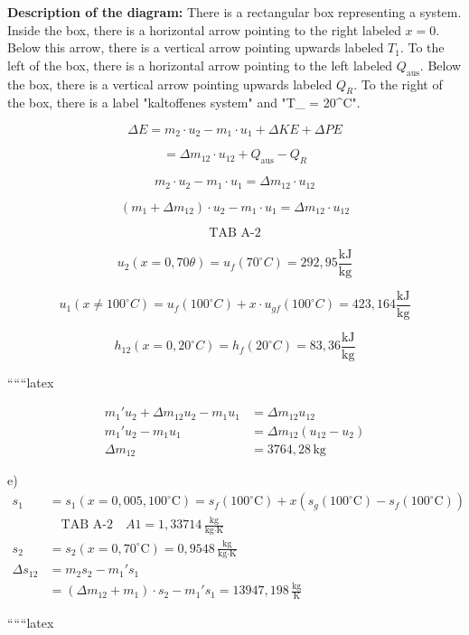 \textbf{Description of the diagram:} There is a rectangular box representing a system. Inside the box, there is a horizontal arrow pointing to the right labeled $x=0$. Below this arrow, there is a vertical arrow pointing upwards labeled $T_1$. To the left of the box, there is a horizontal arrow pointing to the left labeled $Q_{\text{aus}}$. Below the box, there is a vertical arrow pointing upwards labeled $Q_R$. To the right of the box, there is a label "kaltoffenes system" and "T_{} = 20^\circ C".

\[
\Delta E = m_2 \cdot u_2 - m_1 \cdot u_1 + \Delta KE + \Delta PE
\]

\[
= \Delta m_{12} \cdot u_{12} + Q_{\text{aus}} - Q_R
\]

\[
m_2 \cdot u_2 - m_1 \cdot u_1 = \Delta m_{12} \cdot u_{12}
\]

\[
(m_1 + \Delta m_{12}) \cdot u_2 - m_1 \cdot u_1 = \Delta m_{12} \cdot u_{12}
\]

\[
\text{TAB A-2}
\]

\[
u_2 (x=0,70 \theta) = u_f (70^\circ C) = 292,95 \frac{\text{kJ}}{\text{kg}}
\]

\[
u_1 (x \neq 100^\circ C) = u_f (100^\circ C) + x \cdot u_{gf} (100^\circ C) = 423,164 \frac{\text{kJ}}{\text{kg}}
\]

\[
h_{12} (x=0, 20^\circ C) = h_f (20^\circ C) = 83,36 \frac{\text{kJ}}{\text{kg}}
\]

``````latex


\begin{align*}
m_1' u_2 + \Delta m_{12} u_2 - m_1 u_1 &= \Delta m_{12} u_{12} \\
m_1' u_2 - m_1 u_1 &= \Delta m_{12} (u_{12} - u_2) \\
\Delta m_{12} &= 3764,28 \, \text{kg}
\end{align*}

\noindent e)
\begin{align*}
s_1 &= s_1 \left( x = 0,005, 100^\circ \text{C} \right) = s_f (100^\circ \text{C}) + x \left( s_g (100^\circ \text{C}) - s_f (100^\circ \text{C}) \right) \\
&\quad \boxed{\text{TAB A-2}} \quad A1 = 1,33714 \, \frac{\text{kg}}{\text{kg} \cdot \text{K}} \\
s_2 &= s_2 \left( x = 0,70^\circ \text{C} \right) = 0,9548 \, \frac{\text{kg}}{\text{kg} \cdot \text{K}} \\
\Delta s_{12} &= m_2 s_2 - m_1' s_1 \\
&= (\Delta m_{12} + m_1) \cdot s_2 - m_1' s_1 = 13947,198 \, \frac{\text{kg}}{\text{K}}
\end{align*}

``````latex


